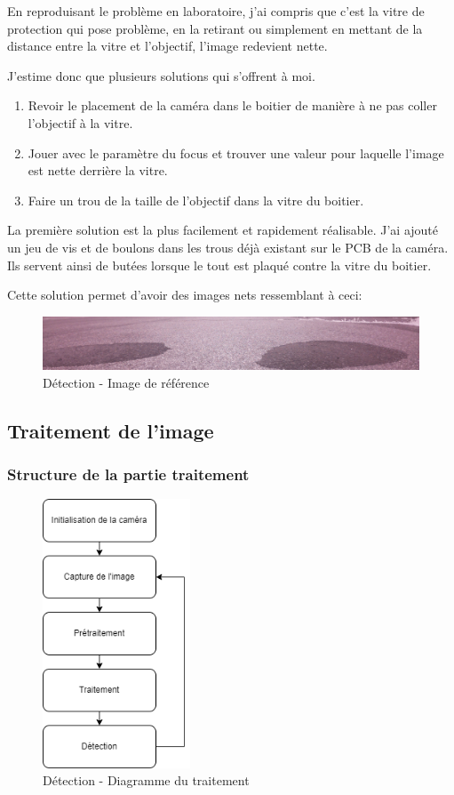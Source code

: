 En reproduisant le problème en laboratoire, j'ai compris que c'est la vitre de protection qui pose problème, en la retirant ou simplement en mettant de la distance entre la vitre et l'objectif, l'image redevient nette.

J'estime donc que plusieurs solutions qui s'offrent à moi.
\begin{enumerate}
    \item Revoir le placement de la caméra dans le boitier de manière à ne pas coller l'objectif à la vitre.
    \item Jouer avec le paramètre du focus et trouver une valeur pour laquelle l'image est nette derrière la vitre.
    \item Faire un trou de la taille de l'objectif dans la vitre du boitier.
\end{enumerate}

La première solution est la plus facilement et rapidement réalisable. J'ai ajouté un jeu de vis et de boulons dans les trous déjà existant sur le PCB de la caméra.
Ils servent ainsi de butées lorsque le tout est plaqué contre la vitre du boitier.

Cette solution permet d'avoir des images nets ressemblant à ceci:
\begin{figure}[H]
    \centering
    \includegraphics[width=13cm]{assets/figures/oil_test.png}
    \caption{Détection - Image de référence}
\end{figure}
\newpage

\subsection{Traitement de l'image}
\subsubsection{Structure de la partie traitement}
\begin{figure}[H]
    \centering
    \includegraphics[height=8cm]{assets/figures/diagramme_traitement.png}
    \caption{Détection - Diagramme du traitement}
\end{figure}

